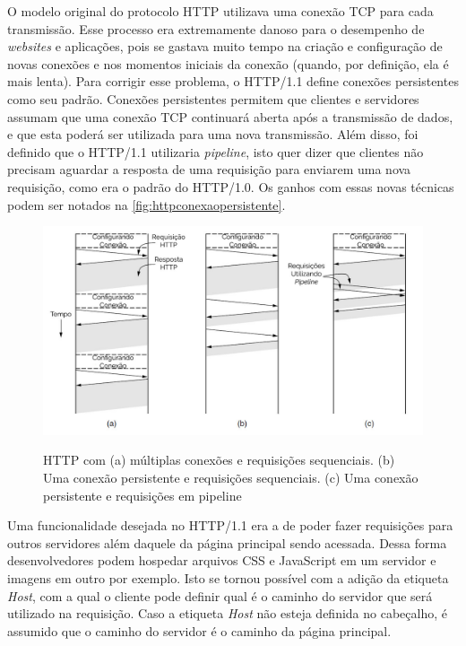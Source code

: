 O modelo original do protocolo HTTP utilizava uma conexão TCP para cada transmissão. Esse processo era extremamente danoso para o desempenho de \textit{websites} e aplicações, pois se gastava muito tempo na criação e configuração de novas conexões e nos momentos iniciais da conexão (quando, por definição, ela é mais lenta). Para corrigir esse problema, o HTTP/1.1 define conexões persistentes como seu padrão. Conexões persistentes permitem que clientes e servidores assumam que uma conexão TCP continuará aberta após a transmissão de dados, e que esta poderá ser utilizada para uma nova transmissão. Além disso, foi definido que o HTTP/1.1 utilizaria \textit{pipeline}, isto quer dizer que clientes não precisam aguardar a resposta de uma requisição para enviarem uma nova requisição, como era o padrão do HTTP/1.0. Os ganhos com essas novas técnicas podem ser notados na \autoref{fig:httpconexaopersistente}.

\begin{figure}[!htb]
    \centering
    \caption{HTTP com (a) múltiplas conexões e requisições sequenciais. (b) Uma conexão persistente e requisições sequenciais. (c) Uma conexão persistente e requisições em pipeline}
    \includegraphics[width=1.0\textwidth]{./04-figuras/fund-teorica/httpconexaopersistente}
    \label{fig:httpconexaopersistente}
\end{figure}

Uma funcionalidade desejada no HTTP/1.1 era a de poder fazer requisições para outros servidores além daquele da página principal sendo acessada. Dessa forma desenvolvedores podem hospedar arquivos CSS e JavaScript em um servidor e imagens em outro por exemplo. Isto se tornou possível com a adição da etiqueta \textit{Host}, com a qual o cliente pode definir qual é o caminho do servidor que será utilizado na requisição. Caso a etiqueta \textit{Host} não esteja definida no cabeçalho, é assumido que o caminho do servidor é o caminho da página principal.

